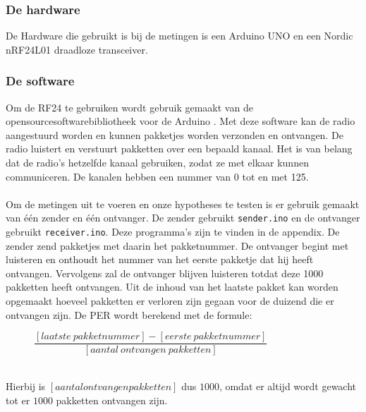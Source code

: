 \documentclass{article}
\begin{document}
\subsubsection{De hardware}
De Hardware die gebruikt is bij de metingen is een Arduino UNO en een Nordic nRF24L01 draadloze transceiver.\\

\subsubsection{De software}
Om de RF24 te gebruiken wordt gebruik gemaakt van de opensourcesoftwarebibliotheek voor de Arduino \cite{rf24}. Met deze software kan de radio aangestuurd worden en kunnen pakketjes worden verzonden en ontvangen. De radio luistert en verstuurt pakketten over een bepaald kanaal. Het is van belang dat de radio's hetzelfde kanaal gebruiken, zodat ze met elkaar kunnen communiceren. De kanalen hebben een nummer van 0 tot en met 125.\\
\\
Om de metingen uit te voeren en onze hypotheses te testen is er gebruik gemaakt van \'{e}\'{e}n zender en \'{e}\'{e}n ontvanger. De zender gebruikt \texttt{sender.ino} en de ontvanger gebruikt \texttt{receiver.ino}. Deze programma's zijn te vinden in de appendix. De zender zend pakketjes met daarin het pakketnummer. De ontvanger begint met luisteren en onthoudt het nummer van het eerste pakketje dat hij heeft ontvangen. Vervolgens zal de ontvanger blijven luisteren totdat deze 1000 pakketten heeft ontvangen. Uit de inhoud van het laatste pakket kan worden opgemaakt hoeveel pakketten er verloren zijn gegaan voor de duizend die er ontvangen zijn. De PER wordt berekend met de formule:\\
\begin{figure}[h]
\center
\indent	$\dfrac{[laatste\ pakketnummer]-[eerste\ pakketnummer]}{[aantal\ ontvangen\ pakketten]}$
\end{figure}\\
Hierbij is $[aantal ontvangen pakketten]$ dus $1000$, omdat er altijd wordt gewacht tot er $1000$ pakketten ontvangen zijn.
\end{document}
